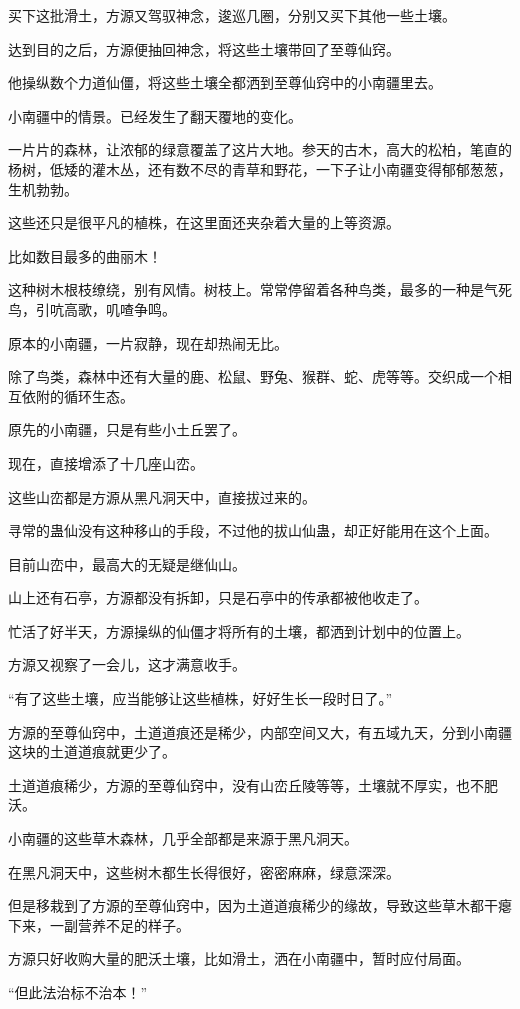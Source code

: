 \begin{this_body}
买下这批滑土，方源又驾驭神念，逡巡几圈，分别又买下其他一些土壤。

达到目的之后，方源便抽回神念，将这些土壤带回了至尊仙窍。

他操纵数个力道仙僵，将这些土壤全都洒到至尊仙窍中的小南疆里去。

小南疆中的情景。已经发生了翻天覆地的变化。

一片片的森林，让浓郁的绿意覆盖了这片大地。参天的古木，高大的松柏，笔直的杨树，低矮的灌木丛，还有数不尽的青草和野花，一下子让小南疆变得郁郁葱葱，生机勃勃。

这些还只是很平凡的植株，在这里面还夹杂着大量的上等资源。

比如数目最多的曲丽木！

这种树木根枝缭绕，别有风情。树枝上。常常停留着各种鸟类，最多的一种是气死鸟，引吭高歌，叽喳争鸣。

原本的小南疆，一片寂静，现在却热闹无比。

除了鸟类，森林中还有大量的鹿、松鼠、野兔、猴群、蛇、虎等等。交织成一个相互依附的循环生态。

原先的小南疆，只是有些小土丘罢了。

现在，直接增添了十几座山峦。

这些山峦都是方源从黑凡洞天中，直接拔过来的。

寻常的蛊仙没有这种移山的手段，不过他的拔山仙蛊，却正好能用在这个上面。

目前山峦中，最高大的无疑是继仙山。

山上还有石亭，方源都没有拆卸，只是石亭中的传承都被他收走了。

忙活了好半天，方源操纵的仙僵才将所有的土壤，都洒到计划中的位置上。

方源又视察了一会儿，这才满意收手。

“有了这些土壤，应当能够让这些植株，好好生长一段时日了。”

方源的至尊仙窍中，土道道痕还是稀少，内部空间又大，有五域九天，分到小南疆这块的土道道痕就更少了。

土道道痕稀少，方源的至尊仙窍中，没有山峦丘陵等等，土壤就不厚实，也不肥沃。

小南疆的这些草木森林，几乎全部都是来源于黑凡洞天。

在黑凡洞天中，这些树木都生长得很好，密密麻麻，绿意深深。

但是移栽到了方源的至尊仙窍中，因为土道道痕稀少的缘故，导致这些草木都干瘪下来，一副营养不足的样子。

方源只好收购大量的肥沃土壤，比如滑土，洒在小南疆中，暂时应付局面。

“但此法治标不治本！”


\end{this_body}
